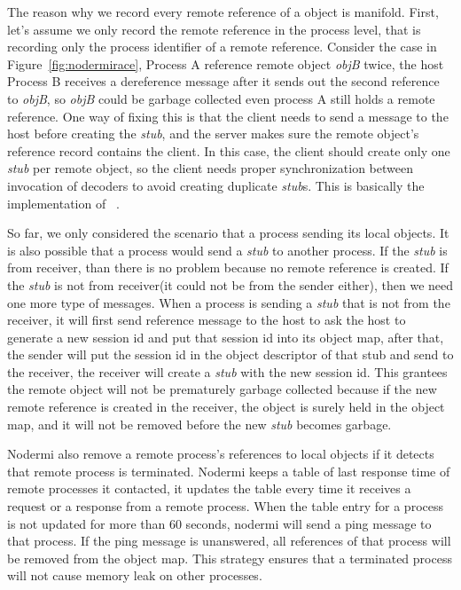 \nodrmiracefig{}

The reason why we record every remote reference of a object is manifold.
First, let's assume we only record the remote reference in the process level,
that is recording only the process identifier of a remote reference.
Consider the case in Figure~\ref{fig:nodermirace},
Process A reference remote object \emph{objB} twice,
the host Process B receives a dereference message
after it sends out the second reference to \emph{objB},
so \emph{objB} could be garbage collected even process A still holds a remote
reference.
One way of fixing this is that
the client needs to send a message to the host before creating the \emph{stub},
and the server makes sure the remote object's reference record contains the client.
In this case, the client should create only one \emph{stub} per remote object,
so the client needs proper synchronization between invocation of decoders to
avoid creating duplicate \emph{stub}s. This is basically the implementation
of ~\cite{birrell1993distributed}. %


So far, we only considered the scenario that a process sending its local
objects.
It is also possible that a process would send a \emph{stub} to another process.
If the \emph{stub} is from receiver, than there is no problem because no remote
reference is created.
If the \emph{stub} is not from receiver(it could not be from the sender either),
then we need one more type of messages.
When a process is sending a \emph{stub} that is not from the receiver,
it will first send reference message to the host to ask the host
to generate a new session id and put that session id into its object map,
after that, the sender will put the session id in the object descriptor of that
stub and send to the receiver,
the receiver will create a \emph{stub} with the new session id.
This grantees the remote object will not be prematurely garbage collected
because if the new remote reference is created in the receiver,
the object is surely held in the object map,
and it will not be removed before the new \emph{stub} becomes garbage.

Nodermi also remove a remote process's references to local objects if
it detects that remote process is terminated.
Nodermi keeps a table of last response time of remote processes it contacted,
it updates the table every time it receives a request or a response from a remote 
process. 
When the table entry for a process is not updated for more than 60 seconds, nodermi
will send a ping message to that process.
If the ping message is unanswered, all references of that process will be removed
from the object map.
This strategy ensures that a terminated process will not cause memory leak on
other processes.


